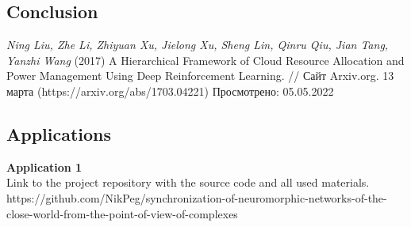 \documentclass[draft]{article}
\newcommand\zz[1]{\par{\normalsize\strut #1} \hfill\ignorespaces}
\begin{document}
\newpage
\begin{center}
\section {Conclusion}
\end{center}

\newpage
\begin{center}
\begin{thebibliography}{}
 \textit{Ning Liu, Zhe Li, Zhiyuan Xu, Jielong Xu, Sheng Lin, Qinru Qiu, Jian Tang, Yanzhi Wang} (2017) A Hierarchical Framework of Cloud Resource Allocation and Power Management Using Deep Reinforcement Learning. // Сайт Arxiv.org. 13 марта (https://arxiv.org/abs/1703.04221) Просмотрено: 05.05.2022
\end{thebibliography}
\end{center}
\newpage
\begin{center}
\section {Applications}
\end{center}
\zz{}\textbf{Application 1\\}
Link to the project repository with the source code and all used materials.\\
https://github.com/NikPeg/synchronization-of-neuromorphic-networks-of-the-close-world-from-the-point-of-view-of-complexes\\
\end{document}
